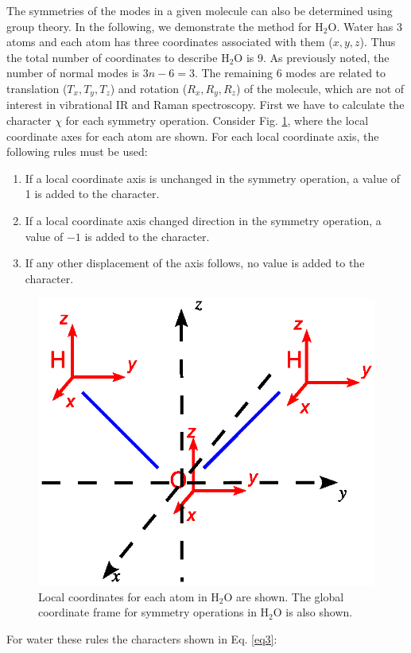 \documentclass[byrevtex,amssymb,aps,pra,floatfix,letterpaper]{revtex4}
\begin{document}
The symmetries of the modes in a given molecule can also be determined using group theory. In the following, we demonstrate the method for H$_2$O. Water has 3 atoms and each atom has three coordinates associated with them ($x, y, z$). Thus the total number of coordinates to describe H$_2$O is 9. As previously noted, the number of normal modes is $3n - 6 = 3$. The remaining 6 modes are related to translation ($T_x, T_y, T_z$) and rotation ($R_x, R_y, R_z$) of the molecule, which are not of interest in vibrational IR and Raman spectroscopy. First we have to calculate the character $\chi$ for each symmetry operation. Consider Fig. \ref{fig3}, where the local coordinate axes for each atom are shown. For each local coordinate axis, the following rules must be used:

\begin{enumerate}
\item If a local coordinate axis is unchanged in the symmetry operation, a value of 1 is added to the character.
\item If a local coordinate axis changed direction in the symmetry operation, a value of $-1$ is added to the character.
\item If any other displacement of the axis follows, no value is added to the character.
\end{enumerate}
\begin{figure}[!htp]
\begin{center}
\includegraphics[scale=0.5]{fig3}
\caption{Local coordinates for each atom in H$_2$O are shown. The global coordinate frame for symmetry operations in H$_2$O is also shown.}
\end{center}
\label{fig3}
\end{figure}
For water these rules the characters shown in Eq. \ref{eq3}:
\end{document}
